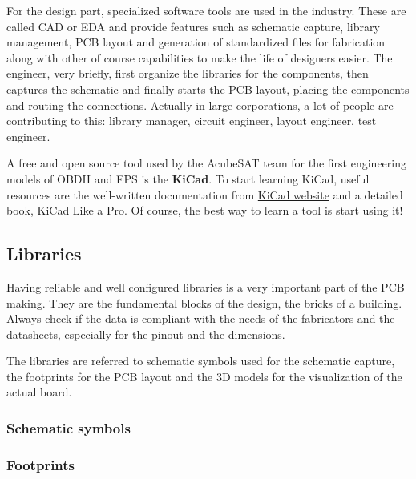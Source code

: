 \documentclass[final]{cubedoc}
\begin{document}
	For the design part, specialized software tools are used in the industry. These are called CAD or EDA and provide features such as schematic capture, library management, PCB layout and generation of standardized files for fabrication along with other of course capabilities to make the life of designers easier. The engineer, very briefly, first organize the libraries for the components, then captures the schematic and finally starts the PCB layout, placing the components and routing the connections. Actually in large corporations, a lot of people are contributing to this: library manager, circuit engineer, layout engineer, test engineer.
	
	A free and open source tool used by the AcubeSAT team for the first engineering models of OBDH and EPS is the \textbf{KiCad}. To start learning KiCad, useful resources are the well-written documentation from \href{http://docs.kicad-pcb.org/}{KiCad website} and a detailed book, KiCad Like a Pro. Of course, the best way to learn a tool is start using it!
	
	\subsection{Libraries}
	
	Having reliable and well configured libraries is a very important part of the PCB making. They are the fundamental blocks of the design, the bricks of a building. Always check if the data is compliant with the needs of the fabricators and the datasheets, especially for the pinout and the dimensions.
	
	The libraries are referred to schematic symbols used for the schematic capture, the footprints for the PCB layout and the 3D models for the visualization of the actual board.
	
	\subsubsection{Schematic symbols}
	
	\subsubsection{Footprints}
	
\end{document}
